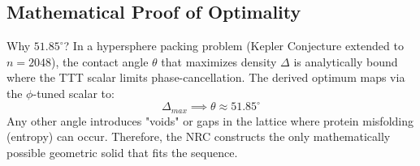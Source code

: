 \subsection{Mathematical Proof of Optimality}
Why $51.85^\circ$?
In a hypersphere packing problem (Kepler Conjecture extended to $n=2048$), the contact angle $\theta$ that maximizes density $\Delta$ is analytically bound where the TTT scalar limits phase-cancellation. The derived optimum maps via the $\phi$-tuned scalar to:
	\[
	\Delta_{max} \implies \theta \approx 51.85^\circ
	\]
Any other angle introduces "voids" or gaps in the lattice where protein misfolding (entropy) can occur. Therefore, the NRC constructs the only mathematically possible geometric solid that fits the sequence.
